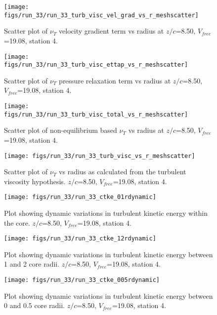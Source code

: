 \begin{figure}[H]
\centering
\texttt{[image: figs/run\_33/run\_33\_turb\_visc\_vel\_grad\_vs\_r\_meshscatter]}
\caption{Scatter plot of $\nu_T$ velocity gradient term vs radius at $z/c$=8.50, $V_{free}$=19.08, station 4.}
\end{figure}


\begin{figure}[H]
\centering
\texttt{[image: figs/run\_33/run\_33\_turb\_visc\_ettap\_vs\_r\_meshscatter]}
\caption{Scatter plot of $\nu_T$ pressure relaxation term vs radius at $z/c$=8.50, $V_{free}$=19.08, station 4.}
\end{figure}


\begin{figure}[H]
\centering
\texttt{[image: figs/run\_33/run\_33\_turb\_visc\_total\_vs\_r\_meshscatter]}
\caption{Scatter plot of non-equilibrium based $\nu_T$ vs radius at $z/c$=8.50, $V_{free}$=19.08, station 4.}
\end{figure}


\begin{figure}[H]
\centering
\texttt{[image: figs/run\_33/run\_33\_turb\_visc\_vs\_r\_meshscatter]}
\caption{Scatter plot of $\nu_T$ vs radius as calculated from the turbulent viscosity hypothesis. $z/c$=8.50, $V_{free}$=19.08, station 4.}
\end{figure}


\begin{figure}[H]
\centering
\texttt{[image: figs/run\_33/run\_33\_ctke\_01rdynamic]}
\caption{Plot showing dynamic variations in turbulent kinetic energy within the core. $z/c$=8.50, $V_{free}$=19.08, station 4.}
\end{figure}


\begin{figure}[H]
\centering
\texttt{[image: figs/run\_33/run\_33\_ctke\_12rdynamic]}
\caption{Plot showing dynamic variations in turbulent kinetic energy between 1 and 2 core radii. $z/c$=8.50, $V_{free}$=19.08, station 4.}
\end{figure}


\begin{figure}[H]
\centering
\texttt{[image: figs/run\_33/run\_33\_ctke\_005rdynamic]}
\caption{Plot showing dynamic variations in turbulent kinetic energy between 0 and 0.5 core radii. $z/c$=8.50, $V_{free}$=19.08, station 4.}
\end{figure}


